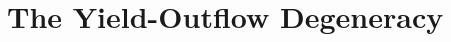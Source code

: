 \documentclass[ms.tex]{subfiles}
\begin{document}
\renewcommand\theequation{\thesection\arabic{equation}}
\renewcommand\thefigure{\thesection\arabic{figure}}
\setcounter{equation}{0}
\setcounter{figure}{0}

\section{The Yield-Outflow Degeneracy}
\label{sec:degeneracy}
\end{document}

